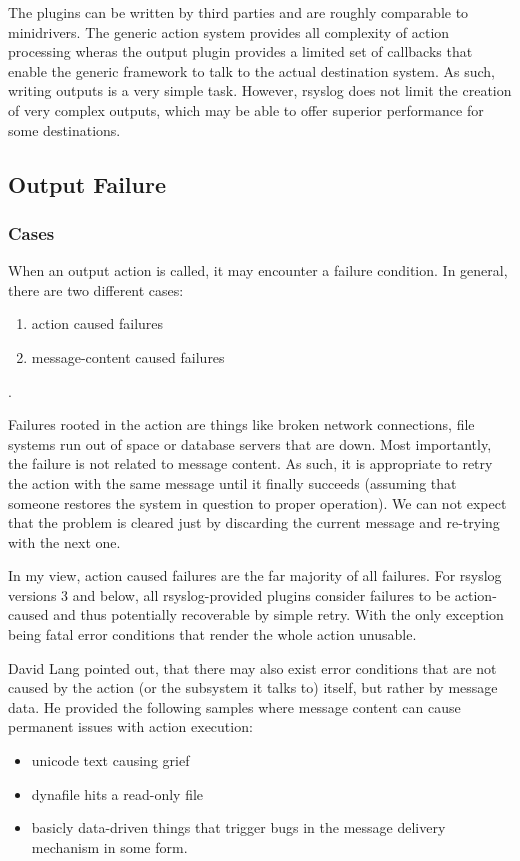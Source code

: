 \documentclass[a4paper,10pt]{article}
\begin{document}
The plugins can be written by third parties and are roughly comparable to minidrivers. The generic action system provides all complexity of action processing wheras the output plugin provides a limited set of callbacks that enable the generic framework to talk to the actual destination system. As such, writing outputs is a very simple task. However, rsyslog does not limit the creation of very complex outputs, which may be able to offer superior performance for some destinations.

\subsection{Output Failure}
\subsubsection{Cases}
When an output action is called, it may encounter a failure condition. In general, there are two different cases:
\begin{enumerate}
\item action caused failures
\item message-content caused failures
\end{enumerate}.

Failures rooted in the action are things like broken network connections, file systems run out of space or database servers that are down. Most importantly, the failure is not related to message content. As such, it is appropriate to retry the action with the same message until it finally succeeds (assuming that someone restores the system in question to proper operation). We can not expect that the problem is cleared just by discarding the current message and re-trying with the next one.

In my view, action caused failures are the far majority of all failures. For rsyslog versions 3 and below, all rsyslog-provided plugins consider failures to be action-caused and thus potentially recoverable by simple retry. With the only exception being fatal error conditions that render the whole action unusable.

David Lang pointed out, that there may also exist error conditions that are not caused by the action (or the subsystem it talks to) itself, but rather by message data. He provided the following samples where message content can cause permanent issues with action execution:

\begin{itemize}
\item unicode text causing grief
\item dynafile hits a read-only file
\item basicly data-driven things that trigger bugs in the message delivery 
mechanism in some form.
\end{itemize}
\end{document}
